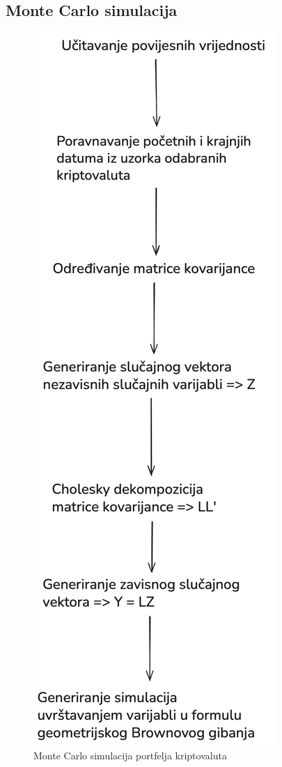 \documentclass[zavrsnirad]{fer}
\begin{document}
\subsection{Monte Carlo simulacija}
\label{sek:monte_carlo_simulacija}
\begin{figure}[H]
    \centering
    \includegraphics[height=0.7\textheight, keepaspectratio]{Figures/Monte_Carlo_explanation.png}
    \caption{Monte Carlo simulacija portfelja kriptovaluta}
    \label{fig:monte_carlo}
\end{figure}
\end{document}
